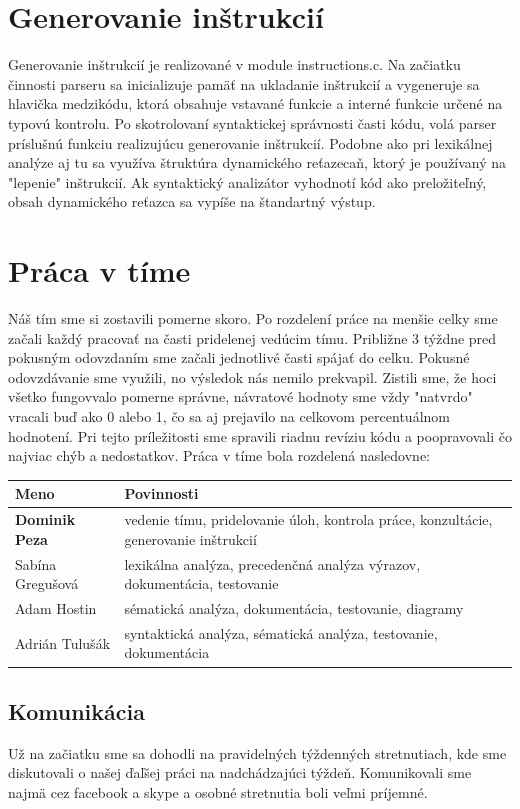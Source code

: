 \documentclass [11pt, a4paper]{article}
\begin{document}
\section{Generovanie inštrukcií}
Generovanie inštrukcií je realizované v module instructions.c. Na začiatku činnosti parseru sa inicializuje pamäť na ukladanie inštrukcií a vygeneruje sa hlavička medzikódu, ktorá obsahuje vstavané funkcie a interné funkcie určené na typovú kontrolu. Po skotrolovaní syntaktickej správnosti časti kódu, volá parser príslušnú funkciu realizujúcu generovanie inštrukcií. Podobne ako pri lexikálnej analýze aj tu sa využíva štruktúra dynamického reťazecaň, ktorý je používaný na "lepenie" inštrukcií. Ak syntaktický analizátor vyhodnotí kód ako preložiteľný, obsah dynamického reťazca sa vypíše na štandartný výstup.

\section{Práca v tíme}
Náš tím sme si zostavili pomerne skoro. Po rozdelení práce na menšie celky sme začali každý pracovať na časti pridelenej vedúcim tímu. Približne 3 týždne pred pokusným odovzdaním sme začali jednotlivé časti spájať do celku. Pokusné odovzdávanie sme využili, no výsledok nás nemilo prekvapil. Zistili sme, že hoci všetko fungovvalo pomerne správne, návratové hodnoty sme vždy "natvrdo" vracali buď ako 0 alebo 1, čo sa aj prejavilo na celkovom percentuálnom hodnotení. Pri tejto príležitosti sme spravili riadnu revíziu kódu a poopravovali čo najviac chýb a nedostatkov. Práca v tíme bola rozdelená nasledovne:

\begin{table}[H]
\centering
\begin{tabular}{|l|l|}
\hline
Meno & Povinnosti\\ \hline
\textbf{Dominik Peza} & vedenie tímu, pridelovanie úloh, kontrola práce, konzultácie, generovanie inštrukcií\\
Sabína Gregušová & lexikálna analýza, precedenčná analýza výrazov, dokumentácia, testovanie\\
Adam Hostin & sématická analýza, dokumentácia, testovanie, diagramy\\
Adrián Tulušák & syntaktická analýza, sématická analýza, testovanie, dokumentácia\\
\hline
\end{tabular}
\end{table}

\subsection{Komunikácia}
Už na začiatku sme sa dohodli na pravidelných týždenných stretnutiach, kde sme diskutovali o našej ďaľšej práci na nadchádzajúci týždeň. Komunikovali sme najmä cez facebook a skype a osobné stretnutia boli veľmi príjemné. 
\end{document}
